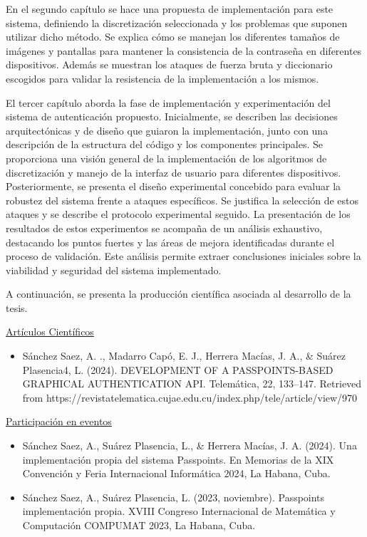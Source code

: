 En el segundo capítulo se hace una propuesta de implementación para este sistema, definiendo la discretización seleccionada y los problemas que suponen utilizar dicho método. Se explica cómo se manejan los diferentes tamaños de imágenes y pantallas para mantener la consistencia de la contraseña en diferentes dispositivos. Además se muestran los ataques de fuerza bruta y diccionario escogidos para validar la resistencia de la implementación a los mismos.

El tercer capítulo aborda la fase de implementación y experimentación del sistema de autenticación propuesto. Inicialmente, se describen las decisiones arquitectónicas y de diseño que guiaron la implementación, junto con una descripción de la estructura del código y los componentes principales. Se proporciona una visión general de la implementación de los algoritmos de discretización y manejo de la interfaz de usuario para diferentes dispositivos. Posteriormente, se presenta el diseño experimental concebido para evaluar la robustez del sistema frente a ataques específicos. Se justifica la selección de estos ataques y se describe el protocolo experimental seguido. La presentación de los resultados de estos experimentos se acompaña de un análisis exhaustivo, destacando los puntos fuertes y las áreas de mejora identificadas durante el proceso de validación. Este análisis permite extraer conclusiones iniciales sobre la viabilidad y seguridad del sistema implementado.

A continuaci\'on, se presenta la producci\'on cient\'ifica asociada al desarrollo de la tesis.

\underline{Art\'iculos Cient\'ificos}
\begin{itemize}
	\item Sánchez Saez, A. ., Madarro Capó, E. J., Herrera Macías, J. A., \& Suárez Plasencia4, L. (2024). DEVELOPMENT OF A PASSPOINTS-BASED GRAPHICAL AUTHENTICATION API. Telemática, 22, 133–147. Retrieved from https://revistatelematica.cujae.edu.cu/index.php/tele/article/view/970
\end{itemize}


\underline{Participaci\'on en eventos}
\begin{itemize}
	\item Sánchez Saez, A., Suárez Plasencia, L., \& Herrera Macías, J. A. (2024). Una implementación propia del sistema Passpoints. En Memorias de la XIX Convención y Feria Internacional Informática 2024, La Habana, Cuba.
	
	\item Sánchez Saez, A., Suárez Plasencia, L. (2023, noviembre). Passpoints implementaci\'on propia. XVIII Congreso Internacional de Matemática y Computación COMPUMAT 2023, La Habana, Cuba.
\end{itemize}

